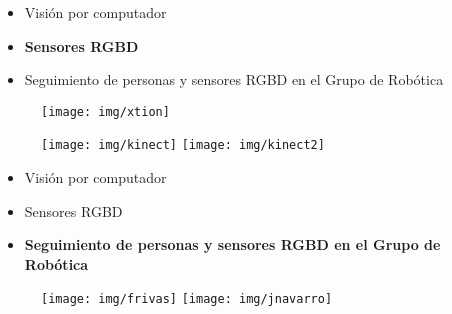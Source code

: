 \documentclass[notes,slidesec,a4]{seminar}
\begin{document}
\begin{hslide}
\begin{minipage}{6cm}
\begin{center}
\begin{itemize}
\item Visión por computador
\item {\bf Sensores RGBD}
\item Seguimiento de personas y sensores RGBD en el Grupo de Robótica
\end{itemize}
\begin{figure}
\texttt{[image: img/xtion]}
\end{figure}
\end{center}
\end{minipage} \hfill
\begin{minipage}{5cm}
\begin{center}
\begin{figure}
\texttt{[image: img/kinect]}
\vspace{0.2cm}
\texttt{[image: img/kinect2]}
\end{figure}
\end{center}
\end{minipage}
\end{hslide}


\begin{hslide}
\begin{minipage}{6cm}
\begin{center}
\begin{itemize}
\item Visión por computador
\item Sensores RGBD
\item {\bf Seguimiento de personas y sensores RGBD en el Grupo de Robótica}
\end{itemize}
\end{center}
\end{minipage} \hfill
\begin{minipage}{5cm}
\begin{center}
\begin{figure}
\texttt{[image: img/frivas]}
\texttt{[image: img/jnavarro]}
\end{figure}
\end{center}
\end{minipage}
\end{hslide}
\end{document}
